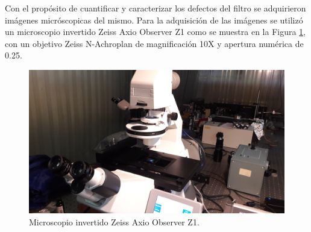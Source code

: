 \hspace{0.5cm}Con el propósito de cuantificar y caracterizar los defectos del filtro se adquirieron imágenes micróscopicas del mismo. Para la adquisición de las imágenes se utilizó un microscopio invertido Zeiss Axio Observer Z1 como se muestra en la Figura \ref{fig:ZEISSdellabo}, con un objetivo Zeiss N-Achroplan de magnificación 10X y apertura numérica de 0.25.
\begin{figure}[H]
	\centering
	\includegraphics[scale=0.1]{Figs/defectosZEISS/b.jpg}
	\caption{Microscopio invertido Zeiss Axio Observer Z1.}
	\label{fig:ZEISSdellabo}
\end{figure}

